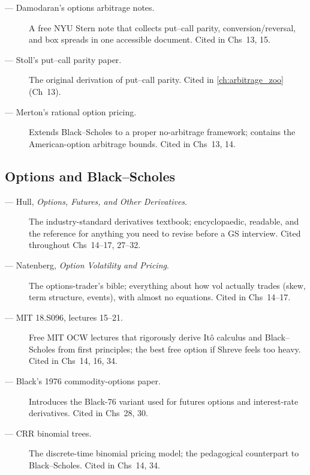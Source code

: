 \begin{description}
  \item[\citet{damodaranOptionsArbitrage} --- Damodaran's options
    arbitrage notes.] A free NYU Stern note that collects put--call
    parity, conversion/reversal, and box spreads in one accessible
    document. Cited in Chs~13, 15.
  \item[\citet{stoll1969relationship} --- Stoll's put--call parity
    paper.] The original derivation of put--call parity. Cited in
    \cref{ch:arbitrage_zoo} (Ch~13).
  \item[\citet{merton1973rational} --- Merton's rational option
    pricing.] Extends Black--Scholes to a proper no-arbitrage
    framework; contains the American-option arbitrage bounds. Cited
    in Chs~13, 14.
\end{description}

\subsection{Options and Black--Scholes}

\begin{description}
  \item[\citet{hull8ed} --- Hull, \emph{Options, Futures, and Other
    Derivatives}.] The industry-standard derivatives textbook;
    encyclopaedic, readable, and the reference for anything you need
    to revise before a GS interview. Cited throughout Chs~14--17,
    27--32.
  \item[\citet{natenberg2015option} --- Natenberg, \emph{Option
    Volatility and Pricing}.] The options-trader's bible; everything
    about how vol actually trades (skew, term structure, events),
    with almost no equations. Cited in Chs~14--17.
  \item[\citet{mit18S096} --- MIT 18.S096, lectures 15--21.] Free MIT
    OCW lectures that rigorously derive It\^o calculus and
    Black--Scholes from first principles; the best free option if
    Shreve feels too heavy. Cited in Chs~14, 16, 34.
  \item[\citet{black1976pricing} --- Black's 1976 commodity-options
    paper.] Introduces the Black-76 variant used for futures options
    and interest-rate derivatives. Cited in Chs~28, 30.
  \item[\citet{coxrossrubinstein1979} --- CRR binomial trees.]
    The discrete-time binomial pricing model; the pedagogical
    counterpart to Black--Scholes. Cited in Chs~14, 34.
\end{description}

